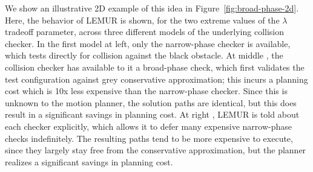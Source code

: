 We show an illustrative 2D example of this idea
in Figure~\ref{fig:broad-phase-2d}.
Here, the behavior of LEMUR is shown,
for the two extreme values of the $\lambda$ tradeoff parameter,
across three different models of the underlying collision checker.
In the first model  at left,
only the narrow-phase checker is available,
which tests directly for collision against the black obstacle.
At middle ,
the collision checker has available to it a broad-phase check,
which first validates the test configuration against grey conservative
approximation;
this incurs a planning cost which is 10x less expensive than the
narrow-phase checker.
Since this is unknown to the motion planner,
the solution paths are identical,
but this does result in a significant savings in planning cost.
At right ,
LEMUR is told about each checker explicitly,
which allows it to defer many expensive narrow-phase checks indefinitely.
The resulting paths tend to be more expensive to execute,
since they largely stay free from the conservative approximation,
but the planner realizes a significant savings in planning cost.

